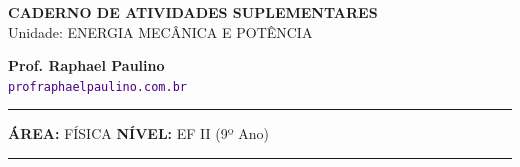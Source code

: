 \documentclass[twoside, 10pt, a4paper]{article}
\begin{document}
\thispagestyle{empty}
\color{Cinzablack}
\vspace*{-1.8cm}

\noindent
\begin{minipage}{\textwidth}
    \selectfont
    \noindent
    \begin{minipage}[t]{0.70\linewidth}
        {\Large \bfseries \MakeUppercase{Caderno de Atividades Suplementares}}\\[0.1cm]
        {\large \textmd{\textcolor{CinzaEscuro}{Unidade: ENERGIA MECÂNICA E POTÊNCIA}}}
    \end{minipage}%
    \begin{minipage}[t]{0.30\linewidth}
        \raggedleft
        \small \textbf{Prof. Raphael Paulino}\\
        \textsf{\small \textcolor{indigo}{\texttt{profraphaelpaulino.com.br}}}
    \end{minipage}
    
    \vspace{0.15cm}
    \noindent\rule{\linewidth}{1.2pt}
    \vspace{-0.1cm}
    \footnotesize\textsf{\textbf{ÁREA:} FÍSICA \hfill \textbf{NÍVEL:} EF II (9º Ano)}
    \vspace{0.1cm}
    \noindent\rule{\linewidth}{0.4pt}
\end{minipage}
\end{document}
